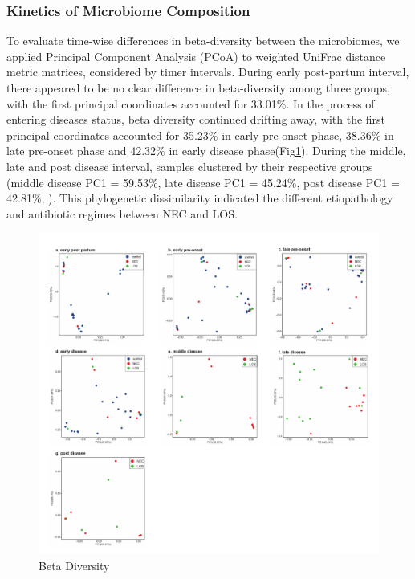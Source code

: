 \documentclass[fleqn,10pt, lineno]{wlpeerj} %
\begin{document}
    \subsubsection*{Kinetics of Microbiome Composition}
    To evaluate time-wise differences in beta-diversity between the microbiomes, we applied Principal Component Analysis (PCoA) to weighted UniFrac distance metric matrices, considered by timer intervals. During early post-partum interval, there appeared to be no clear difference in beta-diversity among three groups, with the first principal coordinates accounted for 33.01\%. In the process of entering diseases status, beta diversity continued drifting away, with the first principal coordinates accounted for 35.23\% in early pre-onset phase, 38.36\% in late pre-onset phase and 42.32\% in early disease phase(Fig\ref{fig:pcoa}).
    During the middle, late and post disease interval, samples clustered by their respective groups (middle disease PC1 = 59.53\%, late disease PC1 = 45.24\%, post disease PC1 = 42.81\%, ). This phylogenetic dissimilarity indicated the different etiopathology and antibiotic regimes between NEC and LOS.
    \begin{figure}[ht]\centering
      \includegraphics[width=\linewidth]{figure/pcoa_time_group.pdf}
      \caption{Beta Diversity}
      \label{fig:pcoa}
    \end{figure}
\end{document}

